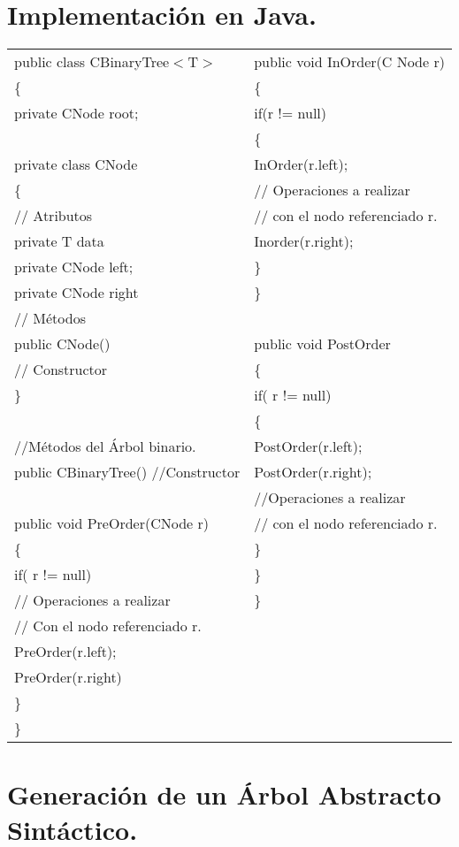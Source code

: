 \documentclass[12pt]{article}
\begin{document}
\begin{tabla}
\section{Implementación en Java.}
\begin{table}[h]
\centering
	\begin{tabular}{l | l }
public class CBinaryTree$<$T$>$ & public void InOrder(C Node r) \\
\{ & \{ \\
private CNode root; & if(r != null) \\
 & \{ \\
private class CNode & InOrder(r.left); \\
\{ & // Operaciones a realizar \\
// Atributos & // con el nodo referenciado r. \\
private T data & Inorder(r.right); \\
private CNode left; & \} \\
private CNode right & \} \\
// Métodos & \\
public CNode(){} & public void PostOrder \\
// Constructor & \{ \\  
\} & if( r != null) \\ 
 & \{ \\
//Métodos del Árbol binario. &  PostOrder(r.left);\\
public CBinaryTree(){} //Constructor & PostOrder(r.right);\\
 & //Operaciones a realizar \\
public void PreOrder(CNode r) & // con el nodo referenciado r. \\
\{ & \} \\
if( r != null) & \} \\
// Operaciones a realizar & \} \\
// Con el nodo referenciado r. & \\ 
PreOrder(r.left); & \\
PreOrder(r.right) & \\
\} & \\
\} & \\
	\end{tabular}
\end{table}
\pagebreak
\section{Generación de un Árbol Abstracto Sintáctico.}


\end{tabla}
\end{document}
